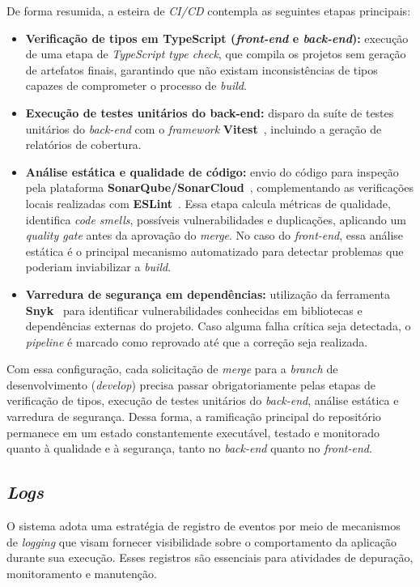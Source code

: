 De forma resumida, a esteira de \textit{CI/CD} contempla as seguintes etapas
principais:

\begin{itemize}
	\item \textbf{Verificação de tipos em TypeScript (\textit{front-end} e \textit{back-end}):}
	execução de uma etapa de \textit{TypeScript type check}, que compila os projetos
	sem geração de artefatos finais, garantindo que não existam inconsistências de
	tipos capazes de comprometer o processo de \textit{build}.
	
	\item \textbf{Execução de testes unitários do back-end:}
	disparo da suíte de testes unitários do \textit{back-end} com o \textit{framework}
	\textbf{Vitest}~\cite{vitest-2025}, incluindo a geração de relatórios de cobertura.
	
	\item \textbf{Análise estática e qualidade de código:}
	envio do código para inspeção pela plataforma \textbf{SonarQube/SonarCloud}~\cite{sonarqube-2025},
	complementando as verificações locais realizadas com \textbf{ESLint}~\cite{eslint-2025}. 
	Essa etapa calcula métricas de qualidade, identifica \textit{code smells},
	possíveis vulnerabilidades e duplicações, aplicando um \textit{quality gate}
	antes da aprovação do \textit{merge}. No caso do \textit{front-end}, essa
	análise estática é o principal mecanismo automatizado para detectar problemas
	que poderiam inviabilizar a \textit{build}.
	
	\item \textbf{Varredura de segurança em dependências:}
	utilização da ferramenta \textbf{Snyk}~\cite{snyk-2025} para identificar
	vulnerabilidades conhecidas em bibliotecas e dependências externas do projeto.
	Caso alguma falha crítica seja detectada, o \textit{pipeline} é marcado como
	reprovado até que a correção seja realizada.
\end{itemize}

Com essa configuração, cada solicitação de \textit{merge} para a \textit{branch} de desenvolvimento (\textit{develop}) precisa passar
obrigatoriamente pelas etapas de verificação de tipos, execução de testes
unitários do \textit{back-end}, análise estática e varredura de segurança. 
Dessa forma, a ramificação principal do repositório permanece em um estado
constantemente executável, testado e monitorado quanto à qualidade e à segurança,
tanto no \textit{back-end} quanto no \textit{front-end}.


\subsection{\textit{Logs}}
O sistema adota uma estratégia de registro de eventos por meio de mecanismos de \textit{logging} que visam fornecer visibilidade sobre o comportamento da aplicação durante sua execução. Esses registros são essenciais para atividades de depuração, monitoramento e manutenção.

